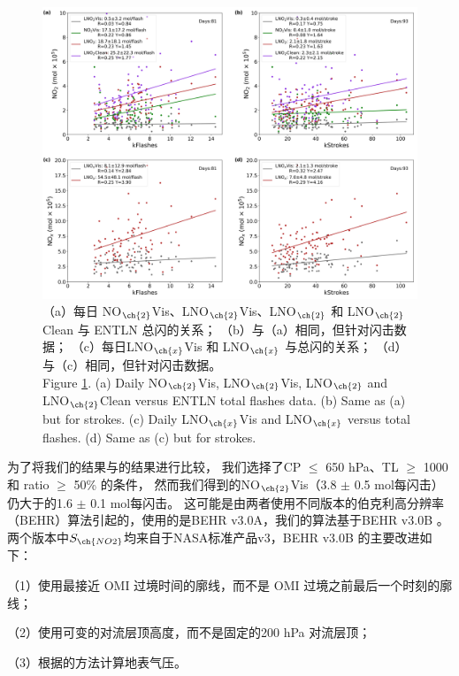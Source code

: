 \begin{figure}[H]
\centering
\includegraphics[width=\textwidth]{./figures/us_pe_linear.png}
\caption{（a）每日 NO$_{\ch{2}}$Vis、LNO$_{\ch{2}}$Vis、LNO$_{\ch{2}}$ 和 LNO$_{\ch{2}}$Clean 与 ENTLN 总闪的关系；
（b）与（a）相同，但针对闪击数据；
（c）每日LNO$_{\ch{x}}$Vis 和 LNO$_{\ch{x}}$ 与总闪的关系；
（d）与（c）相同，但针对闪击数据。\\
Figure \ref{fig:us_pe_linear}.
(a) Daily NO$_{\ch{2}}$Vis, LNO$_{\ch{2}}$Vis, LNO$_{\ch{2}}$ and LNO$_{\ch{2}}$Clean versus ENTLN total flashes data.
(b) Same as (a) but for strokes.
(c) Daily LNO$_{\ch{x}}$Vis and LNO$_{\ch{x}}$ versus total flashes.
(d) Same as (c) but for strokes.}
\label{fig:us_pe_linear}
\end{figure}


为了将我们的结果与\citet{Lapierre.2020}的结果进行比较，
我们选择了CP $\leq$ 650 hPa、TL $\geq$ 1000 和 ratio $\geq$ 50\% 的条件，
然而我们得到的NO$_{\ch{2}}$Vis（3.8 $\pm$ 0.5 mol每闪击）仍大于\citet{Lapierre.2020}的1.6 $\pm$ 0.1 mol每闪击。
这可能是由两者使用不同版本的伯克利高分辨率（BEHR）算法引起的，\citet{Lapierre.2020}使用的是BEHR v3.0A，我们的算法基于BEHR v3.0B \citep{Laughner.2019a}。
两个版本中$S_{\ch{NO2}}$均来自于NASA标准产品v3，BEHR v3.0B 的主要改进如下：

（1）使用最接近 OMI 过境时间的廓线，而不是 OMI 过境之前最后一个时刻的廓线；

（2）使用可变的对流层顶高度，而不是固定的200 hPa 对流层顶；

（3）根据\citet{Zhou.2009}的方法计算地表气压。


